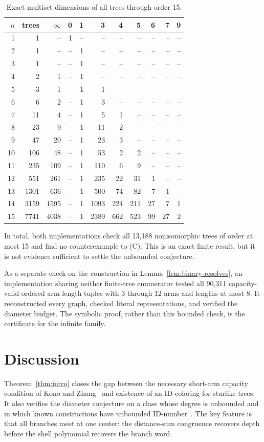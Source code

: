 \documentclass[11pt]{amsart}
\theoremstyle{definition}
\begin{document}
\begin{table}[ht]
\centering
\caption{Exact multiset dimensions of all trees through order 15.}
\label{tab:enumeration}
\small
\setlength{\tabcolsep}{3.7pt}
\begin{tabular}{r r r r r r r r r r r}
\toprule
\(n\)&trees&\(\infty\)&0&1&3&4&5&6&7&9\\
\midrule
1&1&--&1&--&--&--&--&--&--&--\\
2&1&--&--&1&--&--&--&--&--&--\\
3&1&--&--&1&--&--&--&--&--&--\\
4&2&1&--&1&--&--&--&--&--&--\\
5&3&1&--&1&1&--&--&--&--&--\\
6&6&2&--&1&3&--&--&--&--&--\\
7&11&4&--&1&5&1&--&--&--&--\\
8&23&9&--&1&11&2&--&--&--&--\\
9&47&20&--&1&23&3&--&--&--&--\\
10&106&48&--&1&53&2&2&--&--&--\\
11&235&109&--&1&110&6&9&--&--&--\\
12&551&261&--&1&235&22&31&1&--&--\\
13&1301&636&--&1&500&74&82&7&1&--\\
14&3159&1595&--&1&1093&224&211&27&7&1\\
15&7741&4038&--&1&2389&662&523&99&27&2\\
\bottomrule
\end{tabular}
\end{table}

In total, both implementations check all 13,188 nonisomorphic trees of order
at most 15 and find no counterexample to (C).  This is an exact finite result,
but it is not evidence sufficient to settle the unbounded conjecture.

As a separate check on the construction in
Lemma~\ref{lem:binary-resolves}, an implementation sharing neither finite-tree
enumerator tested all 90,311 capacity-valid ordered arm-length tuples with
3 through 12 arms and lengths at most 8.  It reconstructed every graph,
checked literal representations, and verified the diameter budget.  The
symbolic proof, rather than this bounded check, is the certificate for the
infinite family.

\section{Discussion}

Theorem~\ref{thm:intro} closes the gap between the necessary short-arm
capacity condition of Kono and Zhang~\cite{KonoZhang2021} and existence of an
ID-coloring for starlike trees.  It also verifies the diameter conjecture on a
class whose degree is unbounded and in which known constructions have
unbounded ID-number~\cite{KonoZhang2021}.  The key feature is that all branches
meet at one center: the distance-sum congruence recovers depth before the
shell polynomial recovers the branch word.
\end{document}
